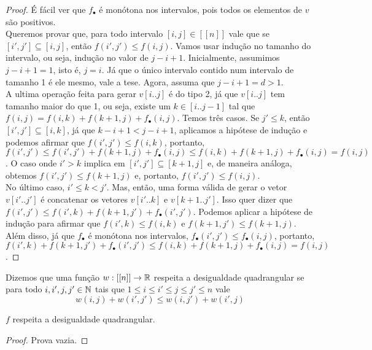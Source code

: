 \begin{proof}
É fácil ver que $f_\bullet$ é monótona nos intervalos, pois todos os elementos de $v$ são positivos. \\
Queremos provar que, para todo intervalo $[i,j] \in [[n]]$ vale que se $[i',j'] \subseteq [i,j]$, então $f(i',j') \leq f(i,j)$. Vamos usar indução no tamanho do intervalo, ou seja, indução no valor de $j - i + 1$. Inicialmente, assumimos $j - i + 1 = 1$, isto é, $j = i$. Já que o único intervalo contido num intervalo de tamanho 1 é ele mesmo, vale a tese. Agora, assuma que $j - i + 1 = d > 1$. \\
A ultima operação feita para gerar $v[i..j]$ é do tipo 2, já que $v[i..j]$ tem tamanho maior do que 1, ou seja, existe um $k \in [i..j-1]$ tal que $f(i,j) = f(i,k) + f(k+1,j) + f_\bullet(i,j)$. Temos três casos. Se $j' \leq k$, então $[i',j'] \subseteq [i,k]$, já que $k - i + 1 < j - i + 1$, aplicamos a hipótese de indução e podemos afirmar que $f(i',j') \leq f(i,k)$, portanto, $f(i',j') \leq f(i',j') + f(k+1,j) + f_\bullet(i,j) \leq f(i,k) + f(k+1,j) + f_\bullet(i,j) = f(i,j)$. O caso onde $i' > k$ implica em $[i',j'] \subseteq [k+1,j]$ e, de maneira análoga, obtemos $f(i',j') \leq f(k+1,j)$ e, portanto, $f(i',j') \leq f(i,j)$. \\
No último caso, $i' \leq k < j'$. Mas, então, uma forma válida de gerar o vetor $v[i'..j']$ é concatenar os vetores $v[i'..k]$ e $v[k+1..j']$. Isso quer dizer que $f(i',j') \leq f(i',k) + f(k+1,j') + f_\bullet(i',j')$. Podemos aplicar a hipótese de indução para afirmar que $f(i',k) \leq f(i,k)$ e $f(k+1,j') \leq f(k+1,j)$. Além disso, já que $f_\bullet$ é monótona nos intervalos, $f_\bullet(i',j') \leq f_\bullet(i,j)$, portanto, $f(i',k) + f(k+1,j') + f_\bullet(i',j') \leq f(i,k) + f(k+1,j) + f_\bullet(i,j) = f(i,j)$.
\end{proof}

\begin{defi} \label{qi}
Dizemos que uma função $w : [[n]] \to \mathbb{R}$ respeita a desigualdade quadrangular se para todo $i,i',j,j' \in \mathbb{N}$ tais que $1 \leq i \leq i' \leq j \leq j' \leq n$ vale
$$ w(i,j) + w(i',j') \leq w(i,j') + w(i',j) $$
\end{defi}

\begin{prop}
$f$ respeita a desigualdade quadrangular.
\end{prop}

\begin{proof}
Prova vazia.
\end{proof}


